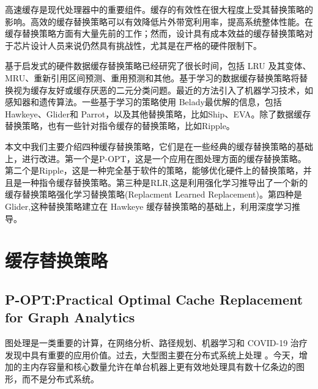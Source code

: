 \documentclass[10pt,journal,compsoc]{IEEEtran}
\begin{document}
% 
% 
% 
% 

高速缓存是现代处理器中的重要组件。缓存的有效性在很大程度上受其替换策略的影响。高效的缓存替换策略可以有效降低片外带宽利用率，提高系统整体性能。在缓存替换策略方面有大量先前的工作；然而，设计具有成本效益的缓存替换策略对于芯片设计人员来说仍然具有挑战性，尤其是在严格的硬件限制下。


基于启发式的硬件数据缓存替换策略已经研究了很长时间，包括 LRU 及其变体\cite{karedla1994,o1993}、MRU、重新引用区间预测、重用预测和其他。基于学习的数据缓存替换策略将替换视为缓存友好或缓存厌恶的二元分类问题。最近的方法引入了机器学习技术，如感知器和遗传算法。一些基于学习的策略使用 Belady\cite{belady1966}最优解的信息，包括 Hawkeye\cite{jain2016back}、Glider和 Parrot，以及其他替换策略，比如Ship\cite{wu2011ship}、EVA\cite{beckmann2017maximizing}。除了数据缓存替换策略，也有一些针对指令缓存的替换策略，比如Ripple。

本文中我们主要介绍四种缓存替换策略，它们是在一些经典的缓存替换策略的基础上，进行改进。第一个是P-OPT，这是一个应用在图处理方面的缓存替换策略。第二个是Ripple，这是一种完全基于软件的策略，能够优化硬件上的替换策略，并且是一种指令缓存替换策略。第三种是RLR,这是利用强化学习推导出了一个新的缓存替换策略强化学习替换策略(Replacment Learned Replacement)。第四种是Glider,这种替换策略建立在 Hawkeye 缓存替换策略的基础上，利用深度学习推导。






\section{缓存替换策略}

\subsection{P-OPT:Practical Optimal Cache Replacement for Graph Analytics}

\hspace{0.5em}图处理是一类重要的计算，在网络分析、路径规划、机器学习和 COVID-19 治疗发现中具有重要的应用价值。过去，大型图主要在分布式系统上处理 。今天，增加的主内存容量和核心数量允许在单台机器上更有效地处理具有数十亿条边的图形，而不是分布式系统。
\end{document}
